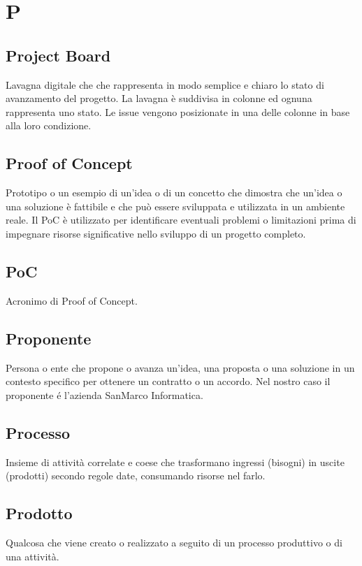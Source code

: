 \section{P}
\subsection{Project Board}%
Lavagna digitale che che rappresenta in modo semplice e chiaro lo stato di avanzamento del progetto. La lavagna è suddivisa in colonne ed ognuna rappresenta uno stato.  Le issue vengono posizionate in una delle colonne in base alla loro condizione.
\subsection{Proof of Concept}%
Prototipo o un esempio di un'idea o di un concetto che dimostra che un'idea o una soluzione è fattibile e che può essere sviluppata e 
utilizzata in un ambiente reale. Il PoC è utilizzato per identificare eventuali problemi o limitazioni prima di impegnare risorse 
significative nello sviluppo di un progetto completo.
\subsection{PoC}%
Acronimo di Proof of Concept.
\subsection{Proponente}%
Persona o ente che propone o avanza un'idea, una proposta o una soluzione in un contesto specifico 
per ottenere un contratto o un accordo.
Nel nostro caso il proponente é l'azienda SanMarco Informatica.
\subsection{Processo}%
Insieme di attività correlate e coese che trasformano
ingressi (bisogni) in uscite (prodotti) secondo regole date,
consumando risorse nel farlo.
\subsection{Prodotto}%
Qualcosa che viene creato o realizzato a seguito di un processo 
produttivo o di una attività.

\clearpage